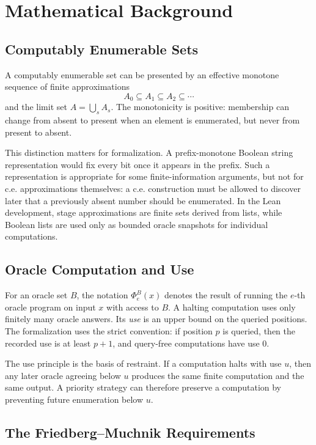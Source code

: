 \section{Mathematical Background}

\subsection{Computably Enumerable Sets}

A computably enumerable set can be presented by an effective monotone
sequence of finite approximations
\[
  A_0 \subseteq A_1 \subseteq A_2 \subseteq \cdots
\]
and the limit set \(A=\bigcup_s A_s\).  The monotonicity is positive:
membership can change from absent to present when an element is enumerated,
but never from present to absent.

This distinction matters for formalization.  A prefix-monotone Boolean
string representation would fix every bit once it appears in the prefix.
Such a representation is appropriate for some finite-information
arguments, but not for c.e. approximations themselves: a c.e. construction
must be allowed to discover later that a previously absent number should be
enumerated.  In the Lean development, stage approximations are finite sets
derived from lists, while Boolean lists are used only as bounded oracle
snapshots for individual computations.

\subsection{Oracle Computation and Use}

For an oracle set \(B\), the notation \(\Phi_e^B(x)\) denotes the result of
running the \(e\)-th oracle program on input \(x\) with access to \(B\).  A
halting computation uses only finitely many oracle answers.  Its
\emph{use} is an upper bound on the queried positions.  The formalization
uses the strict convention: if position \(p\) is queried, then the recorded
use is at least \(p+1\), and query-free computations have use \(0\).

The use principle is the basis of restraint.  If a computation halts with
use \(u\), then any later oracle agreeing below \(u\) produces the same
finite computation and the same output.  A priority strategy can therefore
preserve a computation by preventing future enumeration below \(u\).

\subsection{The Friedberg--Muchnik Requirements}

